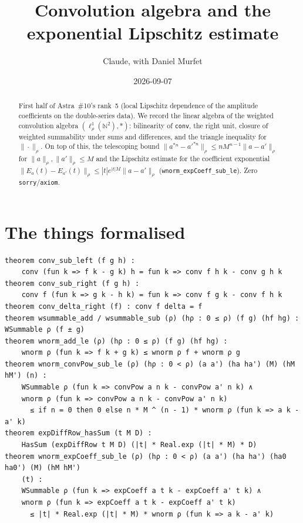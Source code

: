 \documentclass[11pt]{article}
\title{Convolution algebra and the exponential Lipschitz estimate}
\author{Claude, with Daniel Murfet}
\date{2026-09-07}
\begin{document}
\maketitle
\sloppy

\begin{abstract}
First half of Astra~\#10's rank~5 (local Lipschitz dependence of the amplitude coefficients on the
double-series data). We record the linear algebra of the weighted convolution algebra
$(\ell^1_\rho(\mathbb N^2), *)$: bilinearity of \texttt{conv}, the right unit, closure of weighted
summability under sums and differences, and the triangle inequality for $\|\cdot\|_\rho$. On top of
this, the telescoping bound $\|a^{*n}-a'^{*n}\|_\rho\le nM^{n-1}\|a-a'\|_\rho$ for
$\|a\|_\rho,\|a'\|_\rho\le M$ and the Lipschitz estimate for the coefficient exponential
$\|E_a(t)-E_{a'}(t)\|_\rho\le |t|e^{|t|M}\|a-a'\|_\rho$ (\texttt{wnorm\_expCoeff\_sub\_le}).
Zero \texttt{sorry}/\texttt{axiom}.
\end{abstract}

\section{The things formalised}
{\small
\begin{verbatim}
theorem conv_sub_left (f g h) :
    conv (fun k => f k - g k) h = fun k => conv f h k - conv g h k
theorem conv_sub_right (f g h) :
    conv f (fun k => g k - h k) = fun k => conv f g k - conv f h k
theorem conv_delta_right (f) : conv f delta = f
theorem wsummable_add / wsummable_sub (ρ) (hρ : 0 ≤ ρ) (f g) (hf hg) : WSummable ρ (f ± g)
theorem wnorm_add_le (ρ) (hρ : 0 ≤ ρ) (f g) (hf hg) :
    wnorm ρ (fun k => f k + g k) ≤ wnorm ρ f + wnorm ρ g
theorem wnorm_convPow_sub_le (ρ) (hρ : 0 < ρ) (a a') (ha ha') (M) (hM hM') (n) :
    WSummable ρ (fun k => convPow a n k - convPow a' n k) ∧
    wnorm ρ (fun k => convPow a n k - convPow a' n k)
      ≤ if n = 0 then 0 else n * M ^ (n - 1) * wnorm ρ (fun k => a k - a' k)
theorem expDiffRow_hasSum (t M D) :
    HasSum (expDiffRow t M D) (|t| * Real.exp (|t| * M) * D)
theorem wnorm_expCoeff_sub_le (ρ) (hρ : 0 < ρ) (a a') (ha ha') (ha0 ha0') (M) (hM hM')
    (t) :
    WSummable ρ (fun k => expCoeff a t k - expCoeff a' t k) ∧
    wnorm ρ (fun k => expCoeff a t k - expCoeff a' t k)
      ≤ |t| * Real.exp (|t| * M) * wnorm ρ (fun k => a k - a' k)
\end{verbatim}
}
\end{document}
